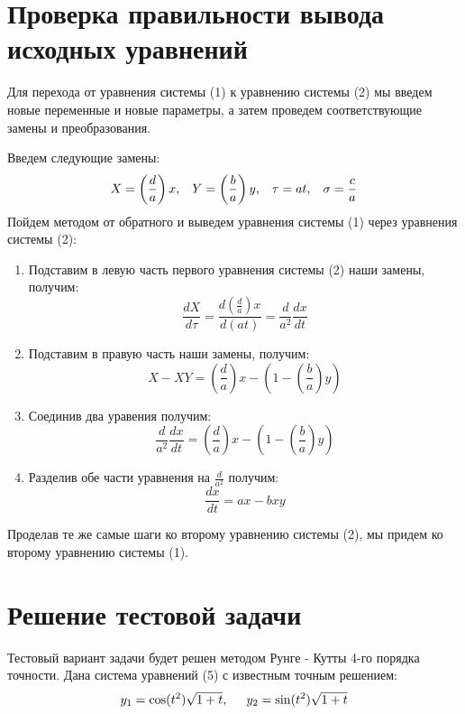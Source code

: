 \documentclass[a4paper,12pt]{article}
\begin{document}
\section{Проверка правильности вывода исходных уравнений}
\hspace{0.5cm} Для перехода от уравнения системы (1) к уравнению системы (2) мы введем новые переменные и новые параметры,
а затем проведем соответствующие замены и преобразования.

Введем следующие замены: 
\begin{equation*}
    X = \left(\frac{d}{a}\right)x, \hspace{0.3cm} Y = \left(\frac{b}{a}\right)y, \hspace{0.3cm} \tau = at, \hspace{0.3cm} \sigma = \frac{c}{a}
\end{equation*}
\hspace{0.5cm} Пойдем методом от обратного и выведем уравнения системы (1) через уравнения системы (2):
\begin{enumerate}
    \item Подставим в левую часть первого уравнения системы (2) наши замены, получим:
    \[ \frac{dX}{d\tau} = \frac{d\left(\frac{d}{a}\right)x}{d(at)} = \frac{d}{a^2} \frac{dx}{dt} \]
    \item Подставим в правую часть наши замены, получим: 
    \[ X - XY = \left(\frac{d}{a}\right)x - \left(1 - \left(\frac{b}{a}\right)y\right) \]
    \item Соединив два уравения получим:
    \[ \frac{d}{a^2} \frac{dx}{dt} = \left(\frac{d}{a}\right)x - \left(1 - \left(\frac{b}{a}\right)y\right) \]
    \item Разделив обе части уравнения на $\frac{d}{a^2}$ получим:
    \[ \frac{dx}{dt} = ax - bxy \]
\end{enumerate}

Проделав те же самые шаги ко второму уравнению системы (2), мы придем ко второму уравнению системы (1).

\newpage
\section{Решение тестовой задачи}
\hspace{0.5cm} Тестовый вариант задачи будет решен методом Рунге - Кутты 4-го порядка точности.
Дана система уравнений (5) с известным точным решением:
\begin{equation*}
    y_1 = \cos(t^2)\sqrt{1 + t}, \hspace{0.5cm} y_2 = \sin(t^2)\sqrt{1 + t}
\end{equation*}
\end{document}

